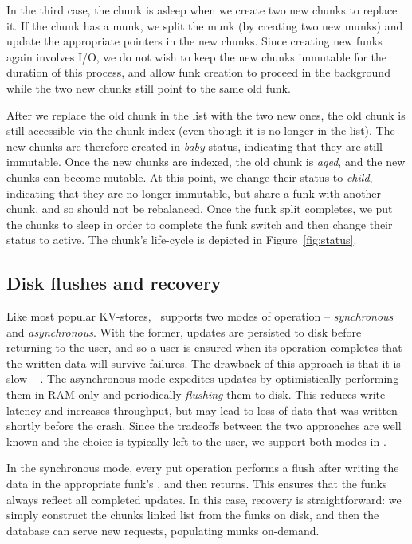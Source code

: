 In the third case, the chunk is asleep when we create two new chunks to replace it. 
If the chunk has a munk, we split the munk (by creating two new munks) and update the appropriate pointers in the new chunks.  
Since creating new funks again involves I/O, we do not wish to keep the new chunks immutable for the duration of this process,
and allow funk creation to proceed in the background while the two new chunks still point to the same old funk. 

After we replace the old chunk in the list with the two new ones, 
the old chunk is still accessible via the chunk index (even though it is no longer in the list). 
The new chunks are therefore created in \emph{baby} status, indicating that they are still immutable. 
Once the new chunks are indexed, the old chunk is \emph{aged}, and the new chunks can become mutable.
At this point, we change their status to \emph{child}, indicating that they are no longer immutable, but share a funk with another chunk,
and so should not be rebalanced. Once the funk split completes, we put the chunks to sleep in order
to complete the funk switch and then change their  status  to active. 
The chunk's life-cycle is depicted in Figure~\ref{fig:status}.

\subsection{Disk flushes and recovery}
\label{ssec:flush-recovery}

Like most popular KV-stores, \sys\ supports two modes of operation -- \emph{synchronous} and \emph{asynchronous}. 
With the former,  updates are persisted to disk before returning to the user, and so a user is ensured when its operation
completes that the written data will survive failures. The drawback of this approach is that it is slow -- . 
The asynchronous mode expedites updates by optimistically performing them in
RAM only and periodically \emph{flushing} them to disk. This reduces write latency and increases throughput, but 
may lead to loss of data that was written shortly before the crash. Since the tradeoffs between the two approaches are 
well known and the choice is typically left to the user, we support both modes in \sys.

In the synchronous mode, every put operation performs a flush after writing the data in the appropriate funk's , and then returns. 
This ensures that the funks always reflect all completed updates. In this case, recovery is straightforward: we simply construct
the chunks linked list from the funks on disk, and then the database can serve new requests, populating munks on-demand.  

